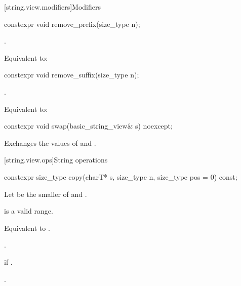 [string.view.modifiers]{Modifiers}

%
\begin{itemdecl}
constexpr void remove_prefix(size_type n);
\end{itemdecl}

\begin{itemdescr}
\pnum
\expects
{}.

\pnum
\effects
Equivalent to: 
\end{itemdescr}

%
\begin{itemdecl}
constexpr void remove_suffix(size_type n);
\end{itemdecl}

\begin{itemdescr}
\pnum
\expects
{}.

\pnum
\effects
Equivalent to: 
\end{itemdescr}

%
\begin{itemdecl}
constexpr void swap(basic_string_view& s) noexcept;
\end{itemdecl}

\begin{itemdescr}
\pnum
\effects
Exchanges the values of  and .
\end{itemdescr}

[string.view.ops]{String operations}

%
\begin{itemdecl}
constexpr size_type copy(charT* s, size_type n, size_type pos = 0) const;
\end{itemdecl}

\begin{itemdescr}
\pnum
Let  be the smaller of  and .

\pnum
\expects
{} is a valid range.

\pnum
\effects
Equivalent to .

\pnum
\returns
{}.

\pnum
\throws
{} if .

\pnum
\complexity
{}.
\end{itemdescr}

